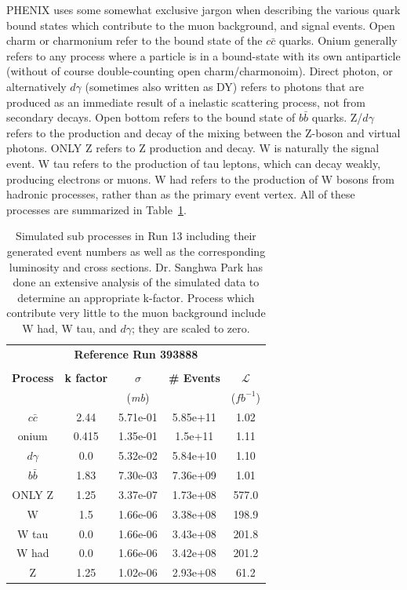 PHENIX uses some somewhat exclusive jargon when describing the various quark
bound states which contribute to the muon background, and signal events.  Open
charm or charmonium refer to the bound state of the $c\bar{c}$ quarks.  Onium
generally refers to any process where a particle is in a bound-state with its
own antiparticle (without of course double-counting open charm/charmonoim).
Direct photon, or alternatively $d\gamma$ (sometimes also written as DY) refers
to photons that are produced as an immediate result of a inelastic scattering
process, not from secondary decays. Open bottom refers to the bound state of
$b\bar{b}$ quarks. Z/$d\gamma$ refers to the production and decay of the mixing
between the Z-boson and virtual photons. ONLY Z refers to Z production and
decay.  W is naturally the signal event. W tau refers to the production of tau
leptons, which can decay weakly, producing electrons or muons. W had refers to
the production of W bosons from hadronic processes, rather than as the primary
event vertex.  All of these processes are summarized in
Table~\ref{tab:simulation_cross_sections}.  
\begin{table}[ht]
  \centering
  \begin{tabular}{ccccc}
    \toprule
    \multicolumn{5}{c}{\textbf{Reference Run 393888}}\\ 
     & & & & \\
    \textbf{Process} & 
    \textbf{k factor} & 
    \textbf{$\sigma$ } & 
    \textbf{\# Events} & 
    \textbf{ $\mathcal{L}$ } \\
    & & (\textit{mb}) &  & ($fb^{-1}$) \\
    \midrule
    $c\bar{c}$ & 2.44  & 5.71e-01 & 5.85e+11 & 1.02 \\
    onium      & 0.415 & 1.35e-01 &  1.5e+11 & 1.11 \\
    $d\gamma$  & 0.0   & 5.32e-02 & 5.84e+10 & 1.10 \\
    $b\bar{b}$ & 1.83  & 7.30e-03 & 7.36e+09 & 1.01 \\
    ONLY Z     & 1.25  & 3.37e-07 & 1.73e+08 & 577.0\\
    W          & 1.5   & 1.66e-06 & 3.38e+08 & 198.9\\
    W tau      & 0.0   & 1.66e-06 & 3.43e+08 & 201.8\\
    W had      & 0.0   & 1.66e-06 & 3.42e+08 & 201.2\\
    Z          & 1.25  & 1.02e-06 & 2.93e+08 & 61.2 \\
    \bottomrule
  \end{tabular}
  \caption{
    Simulated sub processes in Run 13 including their generated event numbers
    as well as the corresponding luminosity and cross sections. Dr. Sanghwa Park
    has done an extensive analysis of the simulated data to determine an
    appropriate k-factor. Process which contribute very little to the muon
    background include W had, W tau, and $d\gamma$; they are scaled to zero.
  }
  \label{tab:simulation_cross_sections}
\end{table}                  


